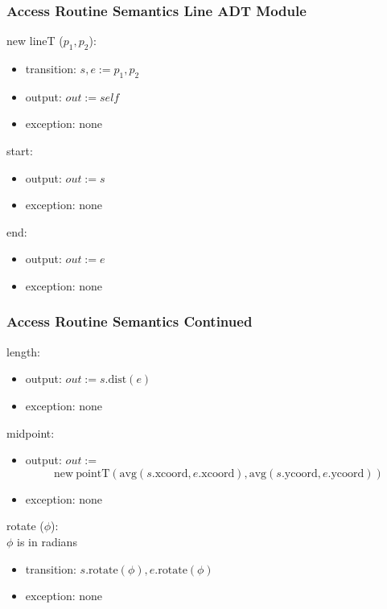 \documentclass[t,12pt,numbers,fleqn]{beamer}
\begin{document}

\begin{frame}
\frametitle{Access Routine Semantics Line ADT Module}

\noindent new lineT ($p_1, p_2$):
\begin{itemize}
\item transition: $s, e := p_1, p_2$
\item output: $out := \mathit{self}$
\item exception: none
\end{itemize}

\noindent start:
\begin{itemize}
\item output: $out := s$
\item exception: none
\end{itemize}

\noindent end:
\begin{itemize}
\item output: $out := e$
\item exception: none
\end{itemize}

\end{frame}


\begin{frame}
\frametitle{Access Routine Semantics Continued}

\noindent length:
\begin{itemize}
\item output: $out := s.\mathrm{dist}(e)$
\item exception: none
\end{itemize}

\noindent midpoint:
\begin{itemize}
\item output: $out := $
$$\mathrm{new~} \mathrm{pointT} (\mathrm{avg}(s.\mathrm{xcoord}, e.\mathrm{xcoord}), \mathrm{avg}(s.\mathrm{ycoord},
e.\mathrm{ycoord}))$$
\item exception: none
\end{itemize}

\noindent rotate ($\phi$):\\
$\phi$ is in radians
\begin{itemize}
\item transition: $s.\mathrm{rotate}(\phi), e.\mathrm{rotate}(\phi)$
\item exception: none
\end{itemize}

\end{frame}
\end{document}
